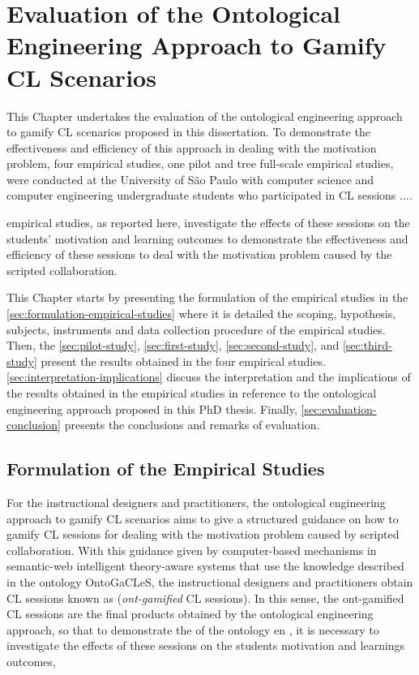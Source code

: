 \chapter[Evaluation of the Ontological Engineering Approach to Gamify CL Scenarios]{Evaluation of the Ontological Engineering Approach to Gamify CL Scenarios}
\label{chapter:evaluation}

This Chapter undertakes the evaluation of the ontological engineering approach to gamify CL scenarios proposed in this dissertation. To demonstrate the effectiveness and efficiency of this approach in dealing with the motivation problem, four empirical studies, one pilot and tree full-scale empirical studies, were conducted at the University of São Paulo with computer science and computer engineering undergraduate students who participated in CL sessions ....

 empirical studies, as reported here, investigate the effects of these sessions on the students’ motivation and learning outcomes to demonstrate the effectiveness and efficiency of these sessions to deal with the motivation problem caused by the scripted collaboration.


This Chapter starts by presenting the formulation of the empirical studies in the \autoref{sec:formulation-empirical-studies} where it is detailed the scoping, hypothesis, subjects, instruments and data collection procedure of the empirical studies. Then, the \autoref{sec:pilot-study}, \autoref{sec:first-study}, \autoref{sec:second-study}, and \autoref{sec:third-study} present the results obtained in the four empirical studies. \autoref{sec:interpretation-implications} discuss the interpretation and the implications of the results obtained in the empirical studies in reference to the ontological engineering approach proposed in this PhD thesis. Finally, \autoref{sec:evaluation-conclusion} presents the conclusions and remarks of evaluation.

\section{Formulation of the Empirical Studies}
\label{sec:formulation-empirical-studies}

For the instructional designers and practitioners, the ontological engineering approach to gamify CL scenarios aims to give a structured guidance on how to gamify CL sessions for dealing with the motivation problem caused by scripted collaboration. With this guidance given by computer-based mechanisms in semantic-web intelligent theory-aware systems that use the knowledge described in the ontology OntoGaCLeS, the instructional designers and practitioners obtain CL sessions known as  (\emph{ont-gamified} CL sessions). In this sense, the ont-gamified CL sessions are the final products obtained by the ontological engineering approach, so that to demonstrate the  of the ontology en , it is necessary to investigate the effects of these sessions on the students motivation and learnings outcomes, 

